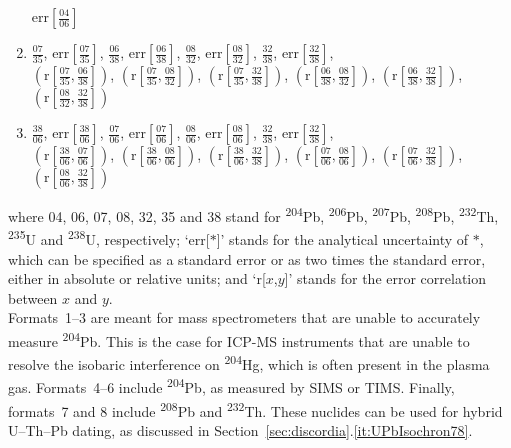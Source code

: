 \begin{refsection}
\begin{enumerate}
  $\mbox{err}\!\left[\frac{04}{06}\right]$
  \item 
  $\frac{07}{35}$,  
  $\mbox{err}\!\left[\frac{07}{35}\right]$, 
  $\frac{06}{38}$,  
  $\mbox{err}\!\left[\frac{06}{38}\right]$,  
  $\frac{08}{32}$,  
  $\mbox{err}\!\left[\frac{08}{32}\right]$,  
  $\frac{32}{38}$,  
  $\mbox{err}\!\left[\frac{32}{38}\right]$,  \\
  $\left(\mbox{r}\!\left[\frac{07}{35},\frac{06}{38}\right]\right)$,  
  $\left(\mbox{r}\!\left[\frac{07}{35},\frac{08}{32}\right]\right)$, 
  $\left(\mbox{r}\!\left[\frac{07}{35},\frac{32}{38}\right]\right)$,  
  $\left(\mbox{r}\!\left[\frac{06}{38},\frac{08}{32}\right]\right)$,  
  $\left(\mbox{r}\!\left[\frac{06}{38},\frac{32}{38}\right]\right)$, 
  $\left(\mbox{r}\!\left[\frac{08}{32},\frac{32}{38}\right]\right)$
  \item
  $\frac{38}{06}$,  
  $\mbox{err}\!\left[\frac{38}{06}\right]$, 
  $\frac{07}{06}$,  
  $\mbox{err}\!\left[\frac{07}{06}\right]$,  
  $\frac{08}{06}$,  
  $\mbox{err}\!\left[\frac{08}{06}\right]$,  
  $\frac{32}{38}$,  
  $\mbox{err}\!\left[\frac{32}{38}\right]$,  \\
  $\left(\mbox{r}\!\left[\frac{38}{06},\frac{07}{06}\right]\right)$,  
  $\left(\mbox{r}\!\left[\frac{38}{06},\frac{08}{06}\right]\right)$, 
  $\left(\mbox{r}\!\left[\frac{38}{06},\frac{32}{38}\right]\right)$,  
  $\left(\mbox{r}\!\left[\frac{07}{06},\frac{08}{06}\right]\right)$,  
  $\left(\mbox{r}\!\left[\frac{07}{06},\frac{32}{38}\right]\right)$, 
  $\left(\mbox{r}\!\left[\frac{08}{06},\frac{32}{38}\right]\right)$
\end{enumerate}

\noindent where 04, 06, 07, 08, 32, 35 and 38 stand for
\textsuperscript{204}Pb, \textsuperscript{206}Pb,
\textsuperscript{207}Pb, \textsuperscript{208}Pb,
\textsuperscript{232}Th, \textsuperscript{235}U and
\textsuperscript{238}U, respectively; `err[$\ast$]' stands for the
analytical uncertainty of $\ast$, which can be specified as a standard
error or as two times the standard error, either in absolute or
relative units; and `r[$x$,$y$]' stands for the error correlation
between $x$ and $y$.\\

Formats~1--3 are meant for mass spectrometers that are unable to
accurately measure \textsuperscript{204}Pb. This is the case for
ICP-MS instruments that are unable to resolve the isobaric
interference on \textsuperscript{204}Hg, which is often present in the
plasma gas. Formats~4--6 include \textsuperscript{204}Pb, as measured
by SIMS or TIMS. Finally, formats~7 and 8 include
\textsuperscript{208}Pb and \textsuperscript{232}Th. These nuclides
can be used for hybrid U--Th--Pb dating, as discussed in
Section~\ref{sec:discordia}.\ref{it:UPbIsochron78}.\\


\end{refsection}
